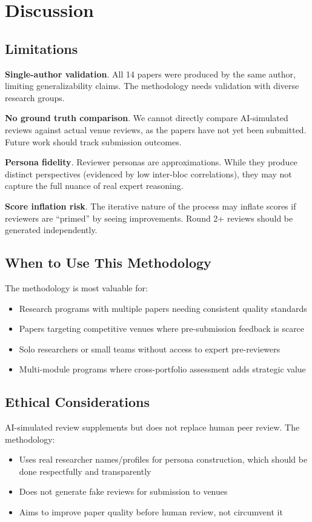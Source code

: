 \section{Discussion}

\subsection{Limitations}

\textbf{Single-author validation}. All 14 papers were produced by the same author, limiting generalizability claims. The methodology needs validation with diverse research groups.

\textbf{No ground truth comparison}. We cannot directly compare AI-simulated reviews against actual venue reviews, as the papers have not yet been submitted. Future work should track submission outcomes.

\textbf{Persona fidelity}. Reviewer personas are approximations. While they produce distinct perspectives (evidenced by low inter-bloc correlations), they may not capture the full nuance of real expert reasoning.

\textbf{Score inflation risk}. The iterative nature of the process may inflate scores if reviewers are ``primed'' by seeing improvements. Round 2+ reviews should be generated independently.

\subsection{When to Use This Methodology}

The methodology is most valuable for:
\begin{itemize}
    \item Research programs with multiple papers needing consistent quality standards
    \item Papers targeting competitive venues where pre-submission feedback is scarce
    \item Solo researchers or small teams without access to expert pre-reviewers
    \item Multi-module programs where cross-portfolio assessment adds strategic value
\end{itemize}

\subsection{Ethical Considerations}

AI-simulated review supplements but does not replace human peer review. The methodology:
\begin{itemize}
    \item Uses real researcher names/profiles for persona construction, which should be done respectfully and transparently
    \item Does not generate fake reviews for submission to venues
    \item Aims to improve paper quality before human review, not circumvent it
\end{itemize}
